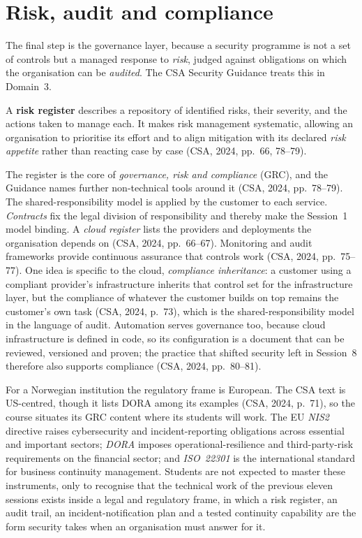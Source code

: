 \section{Risk, audit and compliance}

The final step is the governance layer, because a security programme is not
a set of controls but a managed response to \emph{risk}, judged against
obligations on which the organisation can be \emph{audited}. The CSA
Security Guidance treats this in Domain~3.

\begin{definition}\label{def:riskregister}
A \textbf{risk register} describes a repository of identified risks, their
severity, and the actions taken to manage each. It makes risk management
systematic, allowing an organisation to prioritise its effort and to align
mitigation with its declared \emph{risk appetite} rather than reacting case by case
(CSA, 2024, pp.~66, 78--79).
\end{definition}

The register is the core of \emph{governance, risk and compliance} (GRC),
and the Guidance names further non-technical tools around it (CSA, 2024,
pp.~78--79). The shared-responsibility model is applied by the customer to
each service. \emph{Contracts} fix the legal division of responsibility and
thereby make the Session~1 model binding. A \emph{cloud register} lists the
providers and deployments the organisation depends on (CSA, 2024,
pp.~66--67). Monitoring and audit frameworks provide continuous assurance
that controls work (CSA, 2024, pp.~75--77). One idea is specific to the
cloud, \emph{compliance inheritance}: a customer using a compliant
provider's infrastructure inherits that control set for the infrastructure
layer, but the compliance of whatever the customer builds on top remains
the customer's own task (CSA, 2024, p.~73), which is the
shared-responsibility model in the language of audit. Automation serves
governance too, because cloud infrastructure is defined in code, so its
configuration is a document that can be reviewed, versioned and proven; the
practice that shifted security left in Session~8 therefore also supports
compliance (CSA, 2024, pp.~80--81).

For a Norwegian institution the regulatory frame is European. The CSA text
is US-centred, though it lists DORA among its examples (CSA, 2024, p.~71),
so the course situates its GRC content where its students will work. The EU
\emph{NIS2} directive raises cybersecurity and incident-reporting
obligations across essential and important sectors; \emph{DORA} imposes
operational-resilience and third-party-risk requirements on the financial
sector; and \emph{ISO~22301} is the international standard for business
continuity management. Students are not expected to master these
instruments, only to recognise that the technical work of the previous
eleven sessions exists inside a legal and regulatory frame, in which a risk
register, an audit trail, an incident-notification plan and a tested
continuity capability are the form security takes when an organisation must
answer for it.

